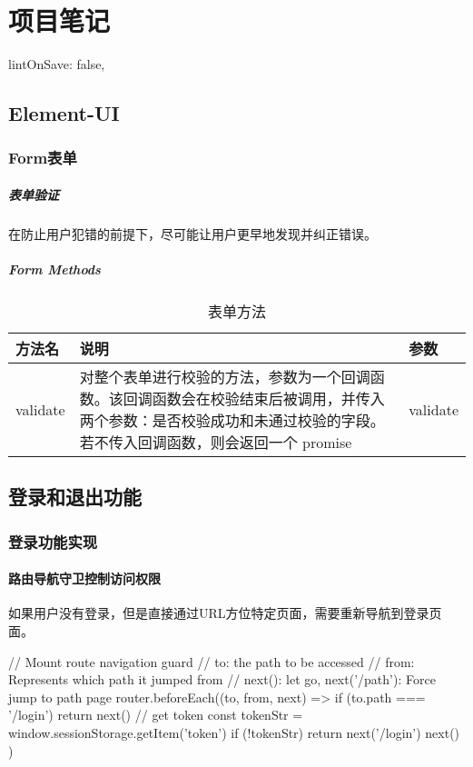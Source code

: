 \chapter{项目笔记}
\begin{js}
    lintOnSave: false,
\end{js}
\section{Element-UI}
\subsection{Form表单}
\paragraph{表单验证}
在防止用户犯错的前提下，尽可能让用户更早地发现并纠正错误。
\paragraph{Form Methods}
\begin{table}[H]
    \centering
    \caption{表单方法}
    \label{formmethods}
    \begin{tabularx}{\textwidth}{lXl}
        \hline
        方法名      & 说明                                                                                     & 参数       \\
        \hline
        validate & 对整个表单进行校验的方法，参数为一个回调函数。该回调函数会在校验结束后被调用，并传入两个参数：是否校验成功和未通过校验的字段。若不传入回调函数，则会返回一个 promise & validate \\
        \hline
    \end{tabularx}

\end{table}

\section{登录和退出功能}
\subsection{登录功能实现}
\subsubsection{路由导航守卫控制访问权限}
如果用户没有登录，但是直接通过URL方位特定页面，需要重新导航到登录页面。
\begin{js}
    // Mount route navigation guard
    // to: the path to be accessed
    // from: Represents which path it jumped from
    // next(): let go, next('/path'): Force jump to path page
    router.beforeEach((to, from, next) => {
    if (to.path === '/login') return next()
    // get token
    const tokenStr = window.sessionStorage.getItem('token')
    if (!tokenStr) return next('/login')
    next()
    })
\end{js}
